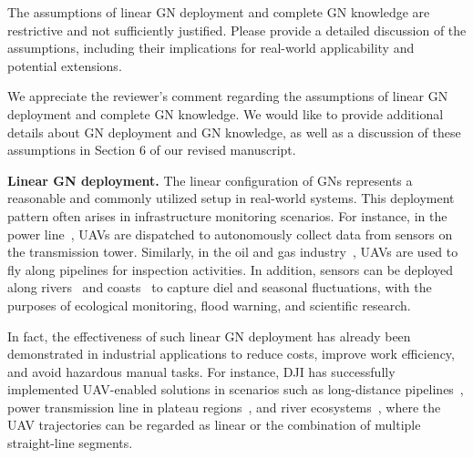 \begin{revcomment}
	The assumptions of linear GN deployment and complete GN knowledge are restrictive and not sufficiently justified. Please provide a detailed discussion of the assumptions, including their implications for real-world applicability and potential extensions.
\end{revcomment}
\begin{revresponse}
	We appreciate the reviewer's comment regarding the assumptions of linear GN deployment and complete GN knowledge.
	We would like to provide additional details about GN deployment and GN knowledge, as well as a discussion of these assumptions in Section 6 of our revised manuscript.

	\textbf{Linear GN deployment.}
	The linear configuration of GNs represents a reasonable and commonly utilized setup in real-world systems.
	This deployment pattern often arises in infrastructure monitoring scenarios.
	For instance, in the power line~\cite{powerline,transmission-line}, UAVs are dispatched to autonomously collect data from sensors on the transmission tower.
	Similarly, in the oil and gas industry~\cite{pipeline}, UAVs are used to fly along pipelines for inspection activities.
	In addition, sensors can be deployed along rivers~\cite{river} and coasts~\cite{coast} to capture diel and seasonal fluctuations, with the purposes of ecological monitoring, flood warning, and scientific research.

	In fact, the effectiveness of such linear GN deployment has already been demonstrated in industrial applications to reduce costs, improve work efficiency, and avoid hazardous manual tasks.
	For instance, DJI has successfully implemented UAV-enabled solutions in scenarios such as long-distance pipelines~\cite{DJI-pipeline}, power transmission line in plateau regions~\cite{DJI-powerline}, and river ecosystems~\cite{DJI-river}, where the UAV trajectories can be regarded as linear or the combination of multiple straight-line segments.


\end{revresponse}
